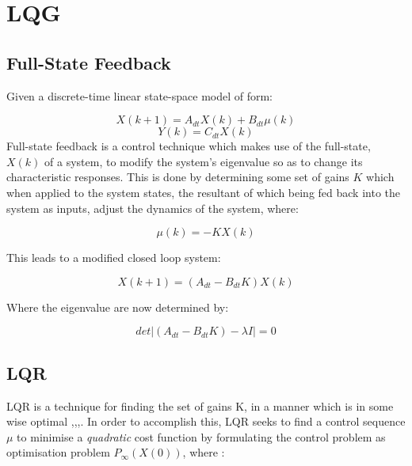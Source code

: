 \documentclass[12pt,a4paper,twoside]{report}
\begin{document}
		\section{LQG}
		
			\subsection{Full-State Feedback}
			
				Given a discrete-time linear state-space model of form:
				
				\[X(k+1) = A_{dt}X(k) + B_{dt} \mu(k)\]
				\begin{equation}
					Y(k) = C_{dt} X(k)
				\end{equation}
				\space
				Full-state feedback is a control technique which makes use of the full-state, $X(k)$ of a system, to modify the system's eigenvalue so as to change its characteristic responses\cite{18}. This is done by determining some set of gains $K$ which when applied to the system states, the resultant of which being fed back into the system as inputs, adjust the dynamics of the system, where:
				
				\begin{equation}
					\mu(k) = -K X(k)
				\end{equation}
				
				This leads to a modified closed loop system:
				
				\begin{equation}
					X(k+1) = (A_{dt}-B_{dt}K) X(k)
				\end{equation}
				
				Where the eigenvalue are now determined by:
				
				\begin{equation}
					det|(A_{dt}-B_{dt}K) - \lambda I| = 0
				\end{equation}
				
			\subsection{LQR}
				
				LQR is a technique for finding the set of gains K, in a manner which is in some wise optimal \cite{18},\cite{19},\cite{20},\cite{25}. In order to accomplish this, LQR seeks to find a control sequence \emph{\emph{$\mu$}} to minimise a \emph{quadratic} cost function by formulating the control problem as optimisation problem \(P_\infty(X(0))\), where :
				
\end{document}
